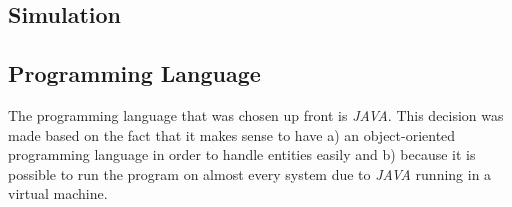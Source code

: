 \subsection{Simulation}\label{subsec:simulation}


\subsection{Programming Language}\label{subsec:programming-language}
The programming language that was chosen up front is \textit{JAVA}.
This decision was made based on the fact that it makes sense to have a) an object-oriented programming language in order to
handle entities easily and b) because it is possible to run the program on almost every system due to \textit{JAVA} running
in a virtual machine.



